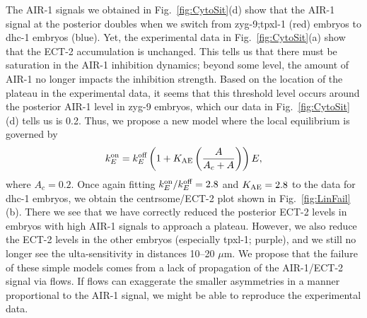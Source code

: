 \documentclass[11pt]{article}
\begin{document}
\begin{appendix}
The AIR-1 signals we obtained in Fig.\ \ref{fig:CytoSit}(d) show that the AIR-1 signal at the posterior doubles when we switch from zyg-9;tpxl-1 (red) embryos to dhc-1 embryos (blue). Yet, the experimental data in Fig.\ \ref{fig:CytoSit}(a) show that the ECT-2 accumulation is unchanged. This tells us that there must be saturation in the AIR-1 inhibition dynamics; beyond some level, the amount of AIR-1 no longer impacts the inhibition strength. Based on the location of the plateau in the experimental data, it seems that this threshold level occurs around the posterior AIR-1 level in zyg-9 embryos, which our data in Fig.\ \ref{fig:CytoSit}(d) tells us is 0.2. Thus, we propose a new model where the local equilibrium is governed by 
\begin{equation}
\label{eq:EctASat}
 k^\text{on}_E = k^\text{off}_E \left(1+K_\text{AE} \left(\frac{A}{A_c+A}\right) \right)E,
\end{equation}
where $A_c=0.2$. Once again fitting $k^\text{on}_E/k^\text{off}_E=2.8$ and $K_\text{AE}=2.8$ to the data for dhc-1 embryos, we obtain the centrsome/ECT-2 plot shown in Fig.\ \ref{fig:LinFail}(b). There we see that we have correctly reduced the posterior ECT-2 levels in embryos with high AIR-1 signals to approach a plateau. However, we also reduce the ECT-2 levels in the other embryos (especially tpxl-1; purple), and we still no longer see the ulta-sensitivity in distances 10--20 $\mu$m. We propose that the failure of these simple models comes from a lack of propagation of the AIR-1/ECT-2 signal via flows. If flows can exaggerate the smaller  asymmetries in a manner proportional to the AIR-1 signal, we might be able to reproduce the experimental data.


\end{appendix}




\end{document}
